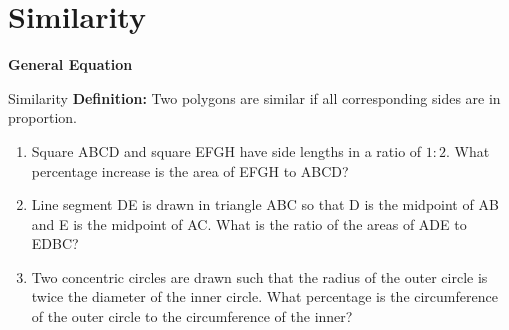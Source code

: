 \section{Similarity}

\textbf{General Equation}

\bigskip
\begin{equationbox}{Similarity}
\textbf{Definition:} Two polygons are similar if all corresponding sides are in proportion.
\end{equationbox}

\vfill
\begin{enumerate}[labelindent=*,style=multiline,leftmargin=*,label=\textbf{Example \arabic*:}]
\item Square ABCD and square EFGH have side lengths in a ratio of $1:2$. What percentage increase is the area of EFGH to ABCD?

\vfill\item Line segment DE is drawn in triangle ABC so that D is the midpoint of AB and E is the midpoint of AC. What is the ratio of the areas of ADE to EDBC?

\vfill\item Two concentric circles are drawn such that the radius of the outer circle is twice the diameter of the inner circle. What percentage is the circumference of the outer circle to the circumference of the inner?
\end{enumerate}

